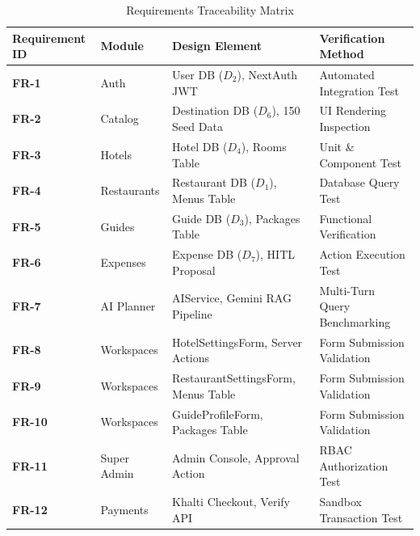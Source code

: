 \documentclass[12pt,a4paper]{report}
\begin{document}
\begin{table}[htbp]
\centering
\small
\caption{Requirements Traceability Matrix}
\label{tab:traceability_matrix}
\begin{tabularx}{\textwidth}{l l X l}
\toprule
\textbf{Requirement ID} & \textbf{Module} & \textbf{Design Element} & \textbf{Verification Method} \\
\midrule
\textbf{FR-1} & Auth & User DB ($D_2$), NextAuth JWT & Automated Integration Test \\
\textbf{FR-2} & Catalog & Destination DB ($D_6$), 150 Seed Data & UI Rendering Inspection \\
\textbf{FR-3} & Hotels & Hotel DB ($D_4$), Rooms Table & Unit \& Component Test \\
\textbf{FR-4} & Restaurants & Restaurant DB ($D_1$), Menus Table & Database Query Test \\
\textbf{FR-5} & Guides & Guide DB ($D_3$), Packages Table & Functional Verification \\
\textbf{FR-6} & Expenses & Expense DB ($D_7$), HITL Proposal & Action Execution Test \\
\textbf{FR-7} & AI Planner & AIService, Gemini RAG Pipeline & Multi-Turn Query Benchmarking \\
\textbf{FR-8} & Workspaces & HotelSettingsForm, Server Actions & Form Submission Validation \\
\textbf{FR-9} & Workspaces & RestaurantSettingsForm, Menus Table & Form Submission Validation \\
\textbf{FR-10} & Workspaces & GuideProfileForm, Packages Table & Form Submission Validation \\
\textbf{FR-11} & Super Admin & Admin Console, Approval Action & RBAC Authorization Test \\
\textbf{FR-12} & Payments & Khalti Checkout, Verify API & Sandbox Transaction Test \\
\bottomrule
\end{tabularx}
\end{table}
\end{document}
